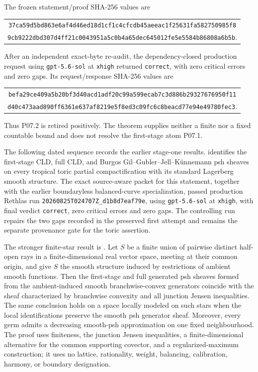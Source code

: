 The frozen statement/proof SHA-256 values are
\begin{center}
\small
\begin{tabular}{@{}c@{}}
\nolinkurl{37ca59d5bd863e6af4d46ed18d1cf1c4cfcdb45aeeac1f25631fa582750985f8}\\
\nolinkurl{9cb9222dbd307d4ff21c0043951a5c0b4a65dec645012fe5e5584b86808a6b5b}.
\end{tabular}
\end{center}
After an independent exact-byte re-audit, the dependency-closed production
request using \texttt{gpt-5.6-sol} at \texttt{xhigh} returned
\texttt{correct}, with zero critical errors and zero gaps.  Its
request/response SHA-256 values are
\begin{center}
\small
\begin{tabular}{@{}c@{}}
\nolinkurl{befa29ce409a5b20bf3d40acd1adf20c99a599ecab7c3d886b29327676950f11}\\
\nolinkurl{d40c473aad890ff6361e637af8219e5f8ed3c09fc6c8beacd77e94e49780fec3}.
\end{tabular}
\end{center}
Thus P07.2 is retired positively.  The theorem supplies neither a finite nor
a fixed countable bound and does not resolve the first-stage atom P07.1.

The following dated sequence records the earlier stage-one results.
 identifies the first-stage CLD,
full CLD, and Burgos Gil--Gubler--Jell--K\"unnemann psh sheaves on every
tropical toric partial compactification with its standard Lagerberg smooth
structure.  The exact source-aware packet for this statement, together with
the earlier boundaryless balanced-curve specialization, passed production
Rethlas run
\nolinkurl{20260825T024707Z_d1b8d7eaf79e}, using
\texttt{gpt-5.6-sol} at \texttt{xhigh}, with final verdict
\texttt{correct}, zero critical errors and zero gaps.  The controlling run
repairs the two gaps recorded in the preserved first attempt and remains the
separate provenance gate for the toric assertion.

The stronger finite-star result is
.  Let \(S\) be a finite union
of pairwise distinct half-open rays in a finite-dimensional real vector
space, meeting at their common origin, and give \(S\) the smooth structure
induced by restrictions of ambient smooth functions.  Then the first-stage
and full generated psh sheaves formed from the ambient-induced smooth
branchwise-convex generators coincide with the sheaf characterized by
branchwise convexity and all junction Jensen inequalities.  The same
conclusion holds on a space locally modeled on such stars when the local
identifications preserve the smooth psh generator sheaf.  Moreover,
every germ admits a decreasing smooth-psh approximation on one fixed
neighbourhood.  The proof uses finiteness, the junction Jensen inequalities,
a finite-dimensional alternative for the common supporting covector, and a
regularized-maximum construction; it uses no lattice, rationality, weight,
balancing, calibration, harmony, or boundary designation.

